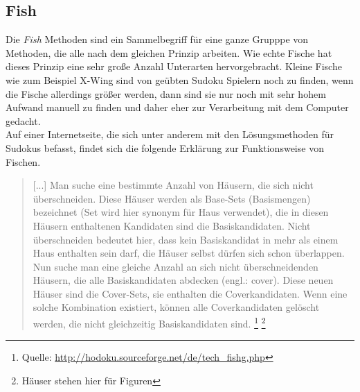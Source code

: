 \newpage
\subsection{Fish}
\label{Fish}
Die \textit{Fish} Methoden sind ein Sammelbegriff für eine ganze Grupppe von Methoden, die alle nach dem gleichen Prinzip arbeiten. Wie echte Fische hat dieses Prinzip eine sehr große Anzahl Unterarten hervorgebracht. Kleine Fische wie zum Beispiel X-Wing sind von geübten Sudoku Spielern noch zu finden, wenn die Fische allerdings größer werden, dann sind sie nur noch mit sehr hohem Aufwand manuell zu finden und daher eher zur Verarbeitung mit dem Computer gedacht. \\
Auf einer Internetseite, die sich unter anderem mit den Lösungsmethoden für Sudokus befasst, findet sich die folgende Erklärung zur Funktionsweise von Fischen.

\begin{quote}[...] Man suche eine bestimmte Anzahl von Häusern, die sich nicht überschneiden. Diese Häuser werden als Base-Sets (Basismengen) bezeichnet (Set wird hier synonym für Haus verwendet), die in diesen Häusern enthaltenen Kandidaten sind die Basiskandidaten. Nicht überschneiden bedeutet hier, dass kein Basiskandidat in mehr als einem Haus enthalten sein darf, die Häuser selbst dürfen sich schon überlappen. Nun suche man eine gleiche Anzahl an sich nicht überschneidenden Häusern, die alle Basiskandidaten abdecken (engl.: cover). Diese neuen Häuser sind die Cover-Sets, sie enthalten die Coverkandidaten. Wenn eine solche Kombination existiert, können alle Coverkandidaten gelöscht werden, die nicht gleichzeitig Basiskandidaten sind.
\footnote{Quelle: \url{http://hodoku.sourceforge.net/de/tech_fishg.php}}
\footnote{Häuser stehen hier für Figuren}
\end{quote}